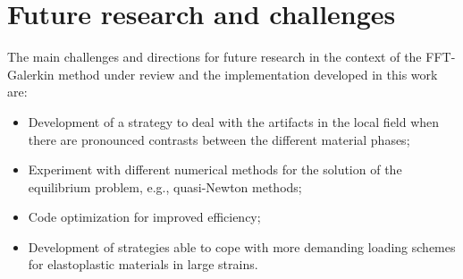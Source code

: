 \section{Future research and challenges}

The main challenges and directions for future research in the context of the FFT-Galerkin method under review \citep{vondrejc_fft-based_2014, zeman_finite_2017, de_geus_finite_2017} and the implementation developed in this work are:
\begin{itemize}
  \item Development of a strategy to deal with the artifacts in the local field when there are pronounced contrasts between the different material phases;
  \item Experiment with different numerical methods for the solution of the equilibrium problem, e.g., quasi-Newton methods;
  \item Code optimization for improved efficiency;
  \item Development of strategies able to cope with more demanding loading schemes for elastoplastic materials in large strains.
\end{itemize}
